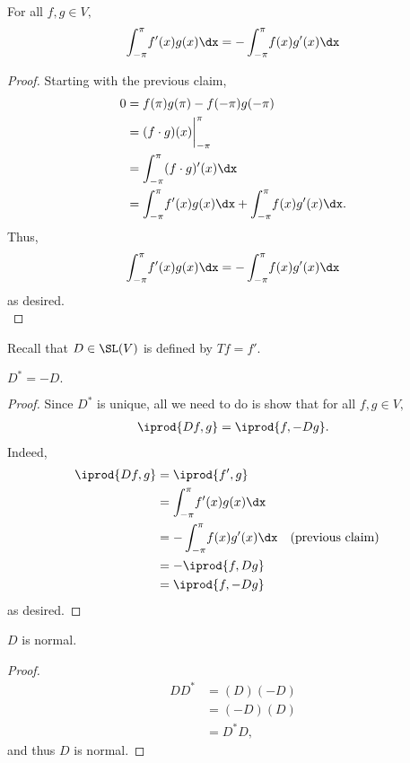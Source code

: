 \documentclass{amsart}
\begin{document}
\begin{claim*}
For all $f,g\in V,$
\begin{align*}
    \int_{-\pi}^{\pi}{\!f'(x)g(x)\dx} = -\int_{-\pi}^{\pi}{\!f(x)g'(x)\dx}
\end{align*}
\end{claim*}
\begin{proof}
Starting with the previous claim,
\begin{align*}
    0 &= f(\pi)g(\pi)-f(-\pi)g(-\pi) \\
      &=(f\cdot g)(x)\bigg\vert_{-\pi}^\pi \\
      &=\int_{-\pi}^{\pi}{\!(f\cdot g)'(x)\dx} \\
      &=\int_{-\pi}^{\pi}{\!f'(x)g(x)\dx}
       +\int_{-\pi}^\pi{\!f(x)g'(x)\dx}.
\end{align*}
Thus,
\begin{align*}
\int_{-\pi}^{\pi}{\!f'(x)g(x)\dx}=-\int_{-\pi}^\pi{\!f(x)g'(x)\dx}
\end{align*}
as desired.\\
\end{proof}

Recall that $D\in\SL(V)$ is defined by $Tf=f'.$
\begin{claim*}
$D^*=-D.$
\end{claim*}
\begin{proof}
Since $D^*$ is unique, all we need to do is show that for all
$f,g\in V,$
\begin{align*}
\iprod{Df,g}=\iprod{f,-Dg}.
\end{align*}
Indeed,
\begin{align*}
    \iprod{Df,g} &= \iprod{f',g}\\
                 &= \int_{-\pi}^{\pi}{\!f'(x)g(x)\dx} \\
                 &=-\int_{-\pi}^\pi{\!f(x)g'(x)\dx} && (\text{previous claim})\\
                 &= -\iprod{f,Dg} \\
                 &= \iprod{f,-Dg}
\end{align*}
as desired.
\end{proof}
\begin{claim*}
    $D$ is normal.
\end{claim*}
\begin{proof}
\begin{align*}
    DD^* &= (D)(-D) \\
         &= (-D)(D) \\
         &= D^*D,
\end{align*}
and thus $D$ is normal.
\end{proof}
\end{document}
